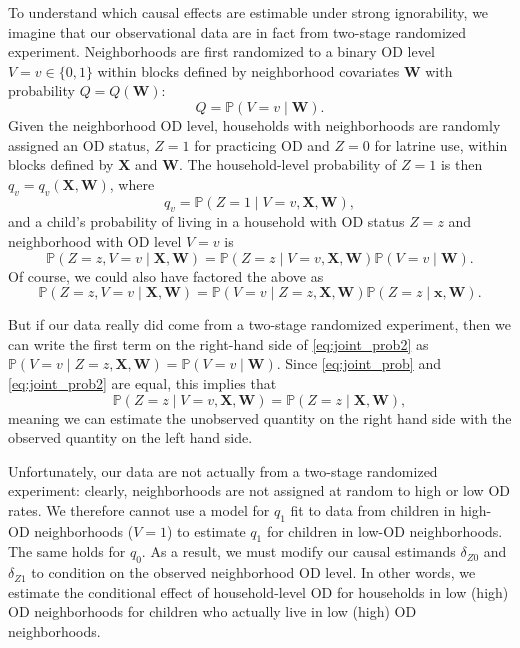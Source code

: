 \documentclass[12pt,a4paper,titlepage]{article}
\begin{document}
\begin{appendices}
To understand which causal effects are estimable under strong ignorability, we imagine that our observational data are in fact from two-stage randomized experiment. Neighborhoods are first randomized to a binary OD level $V = v \in \{0,1\}$ within blocks defined by neighborhood covariates $\mathbf{W}$ with probability $Q = Q(\mathbf{W})$: 
\begin{equation}\label{eq:Q_def}
	Q = \mathbb{P}(V=v \mid \mathbf{W}).
\end{equation}
Given the neighborhood OD level, households with neighborhoods are randomly assigned an OD status, $Z=1$ for practicing OD and $Z=0$ for latrine use, within blocks defined by $\mathbf{X}$ and $\mathbf{W}$. The household-level probability of $Z=1$ is then $q_v = q_v(\mathbf{X}, \mathbf{W})$, where
\begin{equation}\label{eq:qv_def}
	q_v = \mathbb{P}(Z=1 \mid V=v, \mathbf{X}, \mathbf{W}),
\end{equation}
and a child's probability of living in a household with OD status $Z=z$ and neighborhood with OD level $V=v$ is
\begin{equation}\label{eq:joint_prob}
	\mathbb{P}(Z=z, V=v \mid \mathbf{X}, \mathbf{W}) = \mathbb{P}(Z=z \mid V=v, \mathbf{X}, \mathbf{W}) \mathbb{P}(V=v \mid\mathbf{W}).
\end{equation}
Of course, we could also have factored the above as
\begin{equation}\label{eq:joint_prob2}
	\mathbb{P}(Z=z, V=v \mid \mathbf{X}, \mathbf{W}) = \mathbb{P}(V=v \mid Z=z, \mathbf{X}, \mathbf{W}) \mathbb{P}(Z=z \mid\mathbf{x}, \mathbf{W}).
\end{equation}

But if our data really did come from a two-stage randomized experiment, then we can write the first term on the right-hand side of \eqref{eq:joint_prob2} as $\mathbb{P}(V=v \mid Z=z, \mathbf{X}, \mathbf{W}) = \mathbb{P}(V=v \mid \mathbf{W})$. Since \eqref{eq:joint_prob} and \eqref{eq:joint_prob2} are equal, this implies that 
\[
	\mathbb{P}(Z=z \mid V=v, \mathbf{X}, \mathbf{W}) = \mathbb{P}(Z=z \mid \mathbf{X}, \mathbf{W}),
\]
meaning we can estimate the unobserved quantity on the right hand side with the observed quantity on the left hand side.

Unfortunately, our data are not actually from a two-stage randomized experiment: clearly, neighborhoods are not assigned at random to high or low OD rates. We therefore cannot use a model for $q_1$ fit to data from children in high-OD neighborhoods ($V=1$) to estimate $q_1$ for children in low-OD neighborhoods. The same holds for $q_0$. As a result, we must modify our causal estimands $\delta_{Z0}$ and $\delta_{Z1}$ to condition on the observed neighborhood OD level. In other words, we estimate the conditional effect of household-level OD for households in low (high) OD neighborhoods for children who actually live in low (high) OD neighborhoods.


\end{appendices}
\end{document}
